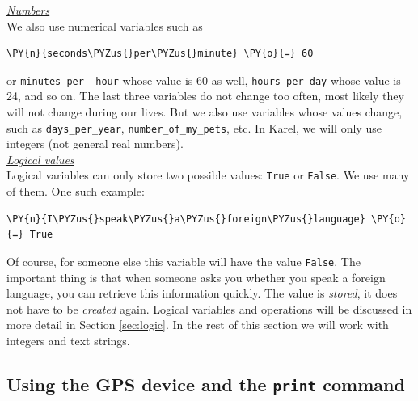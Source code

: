 \noindent
\underline{\em Numbers}\\

\noindent
We also use numerical variables such as\\

\begin{bbox}
\begin{Verbatim}[commandchars=\\\{\}]
\PY{n}{seconds\PYZus{}per\PYZus{}minute} \PY{o}{=} 60
\end{Verbatim}
\end{bbox}
\vspace{6mm}

\noindent
or {\tt minutes\_per \_hour} whose value is 60 as well, 
{\tt hours\_per\_day} whose value is 24, and so on. The last three variables do not change 
too often, most likely they will not change during our lives. But we also use variables whose 
values change, such as {\tt days\_per\_year}, {\tt number\_of\_my\_pets}, etc. In Karel, we
will only use integers (not general real numbers).\\

\noindent
\underline{\em Logical values}\\

\noindent
Logical variables can only store two possible values:
{\tt True} or {\tt False}. We use many of them. One such example: \\

\begin{bbox}
\begin{Verbatim}[commandchars=\\\{\}]
\PY{n}{I\PYZus{}speak\PYZus{}a\PYZus{}foreign\PYZus{}language} \PY{o}{=} True
\end{Verbatim}
\end{bbox}
\vspace{6mm}

\noindent
Of course, for someone else this variable will have the value {\tt False}. The important 
thing is that when someone asks you whether you speak a foreign language, you can retrieve 
this information quickly. The value is {\em stored}, it does not have to be {\em created}
again. Logical variables and operations will be discussed in more detail in Section 
\ref{sec:logic}. In the rest of this section we will work with integers and text strings.

\subsection[\ \ Using the GPS device and the {\tt print} command]{Using the GPS device and the {\tt print} command}


